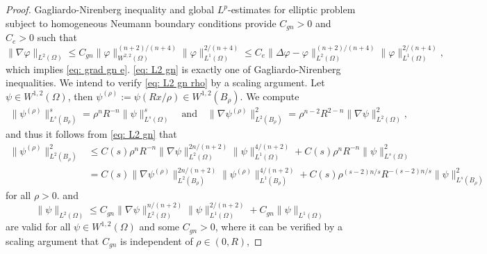\begin{proof}
  Gagliardo-Nirenberg inequality \cite{Nirenberg1959} and 
  global $L^p$-estimates for elliptic problem subject to homogeneous Neumann boundary conditions provide $C_{gn} > 0$ and $C_e > 0$ 
  such that 
  \begin{displaymath}
    \|\nabla \varphi\|_{L^2(\Omega)} 
    \leq C_{gn} \|\varphi\|_{W^{2,2}(\Omega)}^{(n+2)/(n+4)} 
    \|\varphi\|_{L^1(\Omega)}^{2/(n+4)}
    \leq C_e \|\Delta \varphi - \varphi\|_{L^2(\Omega)}^{(n+2)/(n+4)} 
    \|\varphi\|_{L^1(\Omega)}^{2/(n+4)},
  \end{displaymath}
  which implies \eqref{eq: grad gn e}.
  \eqref{eq: L2 gn} is exactly one of Gagliardo-Nirenberg inequalities.
  We intend to verify \eqref{eq: L2 gn rho} by a scaling argument.
  Let $\psi\in W^{1,2}(\Omega)$, 
  then $\psi^{(\rho)} := \psi(Rx/\rho) \in W^{1,2}(B_\rho)$.
  We compute 
  \begin{align*}
    \|\psi^{(\rho)}\|_{L^s(B_\rho)}^s
    = \rho^nR^{-n}\|\psi\|_{L^s(\Omega)}^s
    \quad \text{and}\quad
    \|\nabla\psi^{(\rho)}\|_{L^2(B_\rho)}^2
    = \rho^{n-2}R^{2-n}\|\nabla\psi\|_{L^2(\Omega)}^2,
  \end{align*} 
  and thus it follows from \eqref{eq: L2 gn} that  
  \begin{displaymath}
    \begin{aligned} 
    \|\psi^{(\rho)}\|_{L^2(B_\rho)}^2 
    &\leq C(s) \rho^nR^{-n}\|\nabla \psi\|_{L^2(\Omega)}^{2n/(n+2)}\|\psi\|_{L^1(\Omega)}^{4/(n+2)} 
    + C(s)\rho^nR^{-n}\|\psi\|_{L^{s}(\Omega)}^2\\
    &= C(s) \|\nabla \psi^{(\rho)}\|_{L^2(B_\rho)}^{2n/(n+2)}\|\psi^{(\rho)}\|_{L^1(B_\rho)}^{4/(n+2)} 
    + C(s)\rho^{(s-2)n/s}R^{-(s-2)n/s}\|\psi\|_{L^{s}(B_\rho)}^2
    \end{aligned}
  \end{displaymath}
  for all $\rho > 0$.
  and 
  \begin{displaymath}
    \|\psi\|_{L^2(\Omega)} 
    \leq C_{gn} \|\nabla \psi\|_{L^2(\Omega)}^{n/(n+2)}\|\psi\|_{L^1(\Omega)}^{2/(n+2)} 
    + C_{gn}\|\psi\|_{L^1(\Omega)}
  \end{displaymath}
  are valid for all $\psi\in W^{1,2}(\Omega)$ and some $C_{gn} > 0$, 
  where it can be verified by a scaling argument that 
$C_{gn}$ is independent of $\rho\in(0,R)$,
\end{proof}


